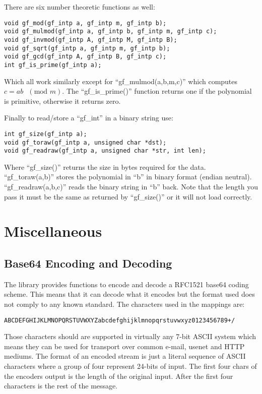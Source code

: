 \documentclass[b5paper]{book}
\begin{document}
There are six number theoretic functions as well:
     
\begin{verbatim}
void gf_mod(gf_intp a, gf_intp m, gf_intp b);
void gf_mulmod(gf_intp a, gf_intp b, gf_intp m, gf_intp c);
void gf_invmod(gf_intp A, gf_intp M, gf_intp B);
void gf_sqrt(gf_intp a, gf_intp m, gf_intp b);
void gf_gcd(gf_intp A, gf_intp B, gf_intp c);
int gf_is_prime(gf_intp a);
\end{verbatim}

Which all work similarly except for  ``gf\_mulmod(a,b,m,c)'' which computes $c = ab\mbox{ }(\mbox{mod }m)$.  The 
``gf\_is\_prime()'' function returns one if the polynomial is primitive, otherwise it returns zero.

Finally to read/store a ``gf\_int'' in a binary string use:
   
\begin{verbatim}
int gf_size(gf_intp a);
void gf_toraw(gf_intp a, unsigned char *dst);
void gf_readraw(gf_intp a, unsigned char *str, int len);
\end{verbatim}
Where ``gf\_size()'' returns the size in bytes required for the data.  ``gf\_toraw(a,b)'' stores the polynomial in ``b''
in binary format (endian neutral).  ``gf\_readraw(a,b,c)'' reads the binary string in ``b'' back.  Note that the length 
you pass it must be the same as returned by ``gf\_size()'' or it will not load correctly.

\chapter{Miscellaneous}
\section{Base64 Encoding and Decoding}
The library provides functions to encode and decode a RFC1521 base64 coding scheme.  This means that it can decode what it 
encodes but the format used does not comply to any known standard.  The characters used in the mappings are:
\begin{verbatim}
ABCDEFGHIJKLMNOPQRSTUVWXYZabcdefghijklmnopqrstuvwxyz0123456789+/
\end{verbatim}
Those characters should are supported in virtually any 7-bit ASCII system which means they can be used for transport over
common e-mail, usenet and HTTP mediums.  The format of an encoded stream is just a literal sequence of ASCII characters
where a group of four represent 24-bits of input.  The first four chars of the encoders output is the length of the 
original input.  After the first four characters is the rest of the message.
\end{document}
